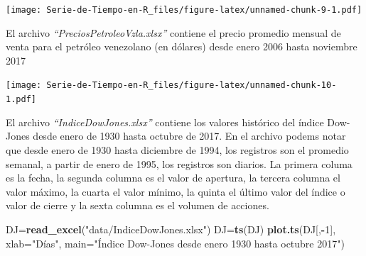 \documentclass[12pt,]{krantz}
\makeatletter
\newenvironment{Shaded}{\begin{snugshade}}{\end{snugshade}}
\newcommand{\KeywordTok}[1]{\textcolor[rgb]{0.13,0.29,0.53}{\textbf{#1}}}
\newcommand{\DataTypeTok}[1]{\textcolor[rgb]{0.13,0.29,0.53}{#1}}
\newcommand{\DecValTok}[1]{\textcolor[rgb]{0.00,0.00,0.81}{#1}}
\newcommand{\StringTok}[1]{\textcolor[rgb]{0.31,0.60,0.02}{#1}}
\newcommand{\CommentTok}[1]{\textcolor[rgb]{0.56,0.35,0.01}{\textit{#1}}}
\newcommand{\OperatorTok}[1]{\textcolor[rgb]{0.81,0.36,0.00}{\textbf{#1}}}
\newcommand{\NormalTok}[1]{#1}
\newenvironment{kframe}{%
\medskip{}
\setlength{\fboxsep}{.8em}
 \def\at@end@of@kframe{}%
 \ifinner\ifhmode%
  \def\at@end@of@kframe{\end{minipage}}%
  \begin{minipage}{\columnwidth}%
 \fi\fi%
 \def\FrameCommand##1{\hskip\@totalleftmargin \hskip-\fboxsep
 \colorbox{shadecolor}{##1}\hskip-\fboxsep
     \hskip-\linewidth \hskip-\@totalleftmargin \hskip\columnwidth}%
 \MakeFramed {\advance\hsize-\width
   \@totalleftmargin\z@ \linewidth\hsize
   \@setminipage}}%
 {\par\unskip\endMakeFramed%
 \at@end@of@kframe}
\renewenvironment{Shaded}{\begin{kframe}}{\end{kframe}}
\theoremstyle{definition}
\theoremstyle{definition}
\theoremstyle{definition}
\theoremstyle{remark}
\let\BeginKnitrBlock\begin \let\EndKnitrBlock\end
\makeatother
\begin{document}
\texttt{[image: Serie-de-Tiempo-en-R\_files/figure-latex/unnamed-chunk-9-1.pdf]}

\BeginKnitrBlock{example}
\protect\hypertarget{exm:precio-petroleo}{}{\label{exm:precio-petroleo} }El
archivo \emph{``PreciosPetroleoVzla.xlsx''} contiene el precio promedio
mensual de venta para el petróleo venezolano (en dólares) desde enero
2006 hasta noviembre 2017
\EndKnitrBlock{example}

\begin{Shaded}
\end{Shaded}

\texttt{[image: Serie-de-Tiempo-en-R\_files/figure-latex/unnamed-chunk-10-1.pdf]}

\BeginKnitrBlock{example}
\protect\hypertarget{exm:indice-dow-jones}{}{\label{exm:indice-dow-jones}
}El archivo \emph{``IndiceDowJones.xlsx''} contiene los valores
histórico del índice Dow-Jones desde enero de 1930 hasta octubre de
2017. En el archivo podems notar que desde enero de 1930 hasta diciembre
de 1994, los registros son el promedio semanal, a partir de enero de
1995, los registros son diarios. La primera columa es la fecha, la
segunda columna es el valor de apertura, la tercera columna el valor
máximo, la cuarta el valor mínimo, la quinta el último valor del índice
o valor de cierre y la sexta columna es el volumen de acciones.
\EndKnitrBlock{example}

\begin{Shaded}
\begin{Highlighting}[]
\NormalTok{DJ=}\KeywordTok{read_excel}\NormalTok{(}\StringTok{"data/IndiceDowJones.xlsx"}\NormalTok{)}
\NormalTok{DJ=}\KeywordTok{ts}\NormalTok{(DJ)}
\KeywordTok{plot.ts}\NormalTok{(DJ[,}\OperatorTok{-}\DecValTok{1}\NormalTok{], }\DataTypeTok{xlab=}\StringTok{"Días"}\NormalTok{,}
        \DataTypeTok{main=}\StringTok{"Índice Dow-Jones desde enero 1930 hasta octubre 2017"}\NormalTok{)}
\end{Highlighting}
\end{Shaded}
\end{document}
